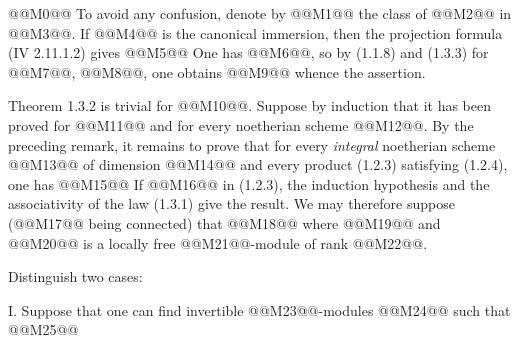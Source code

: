 
@@M0@@
To avoid any confusion, denote by @@M1@@ the class of @@M2@@ in @@M3@@. If @@M4@@ is the canonical immersion, then the projection formula (IV 2.11.1.2) gives
@@M5@@
One has @@M6@@, so by (1.1.8) and (1.3.3) for @@M7@@, @@M8@@, one obtains
@@M9@@
whence the assertion.

Theorem 1.3.2 is trivial for @@M10@@. Suppose by induction that it has been proved for @@M11@@ and for every noetherian scheme @@M12@@. By the preceding remark, it remains to prove that for every \emph{integral} noetherian scheme @@M13@@ of dimension @@M14@@ and every product (1.2.3) satisfying (1.2.4), one has
@@M15@@
If @@M16@@ in (1.2.3), the induction hypothesis and the associativity of the law (1.3.1) give the result. We may therefore suppose (@@M17@@ being connected) that
@@M18@@
where @@M19@@ and @@M20@@ is a locally free @@M21@@-module of rank @@M22@@.

Distinguish two cases:

I. Suppose that one can find invertible @@M23@@-modules @@M24@@ such that
@@M25@@

